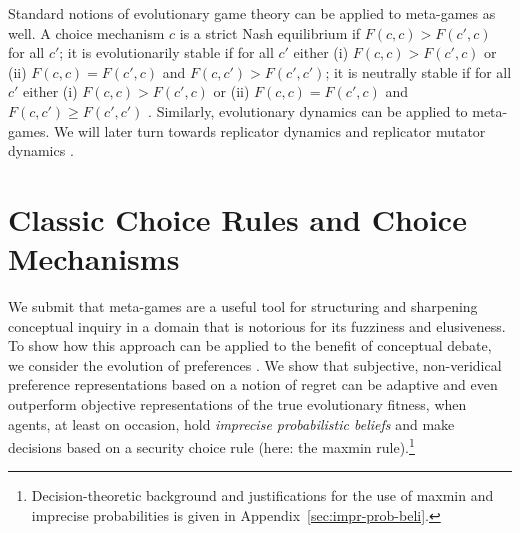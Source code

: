 \documentclass[fleqn,reqno,12pt]{article}
\theoremstyle{Satz}
\theoremstyle{Bsp}
\begin{document}
Standard notions of evolutionary game theory can be applied to meta-games as well. A choice
mechanism $c$ is a strict Nash equilibrium if $F(c,c) > F(c',c)$ for all $c'$; it is
evolutionarily stable if for all $c'$ either (i) $F(c,c) > F(c',c)$ or (ii) $F(c,c) = F(c',c)$
and $F(c,c') > F(c',c')$; it is neutrally stable if for all $c'$ either (i) $F(c,c) > F(c',c)$
or (ii) $F(c,c) = F(c',c)$ and $F(c,c') \ge F(c',c')$
\citep{Maynard-Smith1982:Evolution-and-t}. Similarly, evolutionary dynamics can be applied to
meta-games. We will later turn towards replicator dynamics
\citep{TaylorJonker1978:Evolutionary-St} and replicator mutator dynamics
\citep[e.g.][]{Nowak2006:Evolutionary-Dy}.




\section{Classic Choice Rules and Choice Mechanisms}
\label{sec:basic-notions}

We submit that meta-games are a useful tool for structuring and sharpening conceptual inquiry
in a domain that is notorious for its fuzziness and elusiveness. To show how this approach can
be applied to the benefit of conceptual debate, we consider the evolution of preferences
\citep[e.g.,][]{algweib13,DekElyYlan07,RobSam11}. 
We show that subjective, non-veridical preference
representations based on a notion of regret can be adaptive and even outperform objective representations of the true evolutionary fitness, when agents, at least on occasion, hold
\emph{imprecise probabilistic beliefs} \citep[e.g.,][]{gilsch89,levi74,gardsah82} and make
decisions based on a security choice rule (here: the maxmin rule).\footnote{Decision-theoretic background and justifications for the use of maxmin and imprecise probabilities is given in Appendix~\ref{sec:impr-prob-beli}.}
\end{document}
